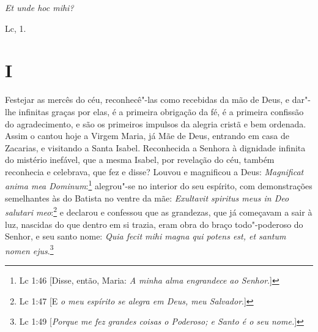 \epigraph{\emph{Et unde hoc mihi?}}{Lc, 1.\footnotemark}

\section*{I}

\noindent{}Festejar as mercês do céu, reconhecê"-las como recebidas da mão de Deus,
e dar"-lhe infinitas graças por elas, é a primeira obrigação da fé, é a
primeira confissão do agradecimento, e são os primeiros impulsos da
alegria cristã e bem ordenada. Assim o cantou hoje a Virgem Maria, já
Mãe de Deus, entrando em casa de Zacarias, e visitando a Santa Isabel.
Reconhecida a Senhora à dignidade infinita do mistério inefável, que a
mesma Isabel, por revelação do céu, também reconhecia e celebrava, que
fez e disse? Louvou e magnificou a Deus: \emph{Magnificat anima mea
Dominum}:\footnote{Lc 1:46 [Disse, então, Maria: \textit{A minha alma engrandece ao Senhor}.]} alegrou"-se no interior do seu espírito, com
demonstrações semelhantes às do Batista no ventre da mãe:
\emph{Exultavit spiritus meus in Deo salutari meo}:\footnote{Lc 1:47 [E \textit{o meu espírito se alegra em Deus, meu Salvador}.]} e declarou e
confessou que as grandezas, que já começavam a sair à luz, nascidas do
que dentro em si trazia, eram obra do braço todo"-poderoso do Senhor, e
seu santo nome: \emph{Quia fecit mihi magna qui potens est, et santum
nomen ejus}.\footnote{Lc 1:49 [\textit{Porque me fez grandes coisas o Poderoso; e Santo é o seu nome.}]}

